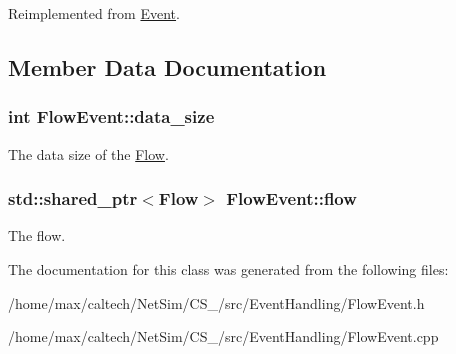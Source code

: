 \-Reimplemented from \hyperlink{classEvent_a924194a887aa70888e08a04b69389bd6}{\-Event}.



\subsection{\-Member \-Data \-Documentation}
\hypertarget{classFlowEvent_ae6010e994bd60eff8cb63478f1df0f40}{
\subsubsection[{data\-\_\-size}]{\setlength{\rightskip}{0pt plus 5cm}int {\bf \-Flow\-Event\-::data\-\_\-size}}}\label{classFlowEvent_ae6010e994bd60eff8cb63478f1df0f40}


\-The data size of the \hyperlink{classFlow}{\-Flow}. 

\hypertarget{classFlowEvent_a217afa55c409554f1dc37d15b559429f}{
\subsubsection[{flow}]{\setlength{\rightskip}{0pt plus 5cm}std\-::shared\-\_\-ptr$<${\bf \-Flow}$>$ {\bf \-Flow\-Event\-::flow}}}\label{classFlowEvent_a217afa55c409554f1dc37d15b559429f}


\-The flow. 



\-The documentation for this class was generated from the following files\-:\begin{DoxyCompactItemize}
\item 
/home/max/caltech/\-Net\-Sim/\-C\-S\-\_/src/\-Event\-Handling/\-Flow\-Event.\-h\item 
/home/max/caltech/\-Net\-Sim/\-C\-S\-\_/src/\-Event\-Handling/\-Flow\-Event.\-cpp\end{DoxyCompactItemize}
